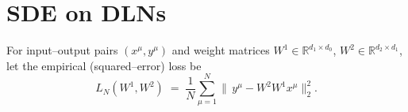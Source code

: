 \documentclass[11pt]{article}
\begin{document}
\section{SDE on DLNs}
\begin{comment}
Consider a two layer linear network with weight matrices $W^1$ and $W^2$ and input data $x^{\mu}$ and output data $y^{\mu}$. The empirical loss is given by:
\begin{align}
L_N(W^1, W^2; D_N) = \frac{1}{N} \sum_{\mu=1}^N ||y^{\mu} - W^2 W^1 x^{\mu}||_2
\end{align}
The gradient is given by:
\begin{align}
    g_{mn}^{\nu} & = \frac{\partial}{\partial W_{mn}^{\nu}} L_N(W^1, W^2) \\ 
    & = \frac{1}{N} \frac{\partial}{\partial W_{mn}^{\nu}} \sum_{\mu=1}^N (y^{\mu T}y^{\mu} - x^{\mu T}W^{1T}W^{2T}y^{\mu} - y^{\mu T}W^{2}W^{1}x^{\mu} + x^{\mu T}W^{1T}W^{2T}W^{2}W^1x^{\mu}) \\
    & = \frac{1}{N} \frac{\partial}{\partial W_{mn}^{\nu}} \sum_{\mu=1}^N (y^{\mu }_i y^{\mu}_i - x^{\mu}_i W^{1}_{ki}W^{2}_{jk}y^{\mu}_j - y^{\mu}_iW^{2}_{ik}W^{1}_{kj}x^{\mu}_j + x^{\mu}_lW^{1}_{kl}W^{2}_{ki}W^{2}_{ip}W^1_{pr}x^{\mu}_{r})\\
\end{align}
Let's compute the gradient w.r.t to the first weight matrix $W^1$.
\begin{align}
    g^1_{mn} & = \frac{1}{N} \sum_{\mu=1}^N ( - x^{\mu}_i\delta_{km,in}W^{2}_{jk}y^{\mu}_j - y^{\mu}_iW^{2}_{ik}\delta_{km, jn}x^{\mu}_j + x^{\mu}_l\delta_{km, ln}W^{2}_{ki}W^{2}_{ip}W^1_{pr}x^{\mu}_{r} + x^{\mu}_lW^{1}_{kl}W^{2}_{ki}W^{2}_{ip}\delta_{pm, rn}x^{\mu}_{r})\\
    & = \frac{1}{N} \sum_{\mu=1}^N - x^{\mu}_n W^{2}_{jm}y^{\mu}_j - y^{\mu}_iW^{2}_{im}x^{\mu}_n + x^{\mu}_nW^{2}_{mi}W^{2}_{ip}W^1_{pr}x^{\mu}_{r} + x^{\mu}_lW^{1}_{kl}W^{2}_{ki}W^{2}_{im}x^{\mu}_{n}\\
\end{align}
Which in matrix form is:
\begin{align}
    g^1 = \frac{2}{N} \sum_{\mu=1}^N (- x^{\mu}y^{\mu T}W^{2T} + x^{\mu}x^{\mu T}W^{1T}W^{2T}W^{2})  
\end{align}
\end{comment}
For input–output pairs \((x^{\mu},y^{\mu})\) and weight matrices
\(W^{1}\in\mathbb R^{d_{1}\times d_{0}}\), \(W^{2}\in\mathbb R^{d_{2}\times d_{1}}\),
let the empirical (squared–error) loss be
\[
L_N(W^{1},W^{2})
   \;=\;
   \frac{1}{N}\sum_{\mu=1}^{N}
   \bigl\lVert\,y^{\mu}-W^{2}W^{1}x^{\mu}\bigr\rVert_2^{2}.
\]
\end{document}
